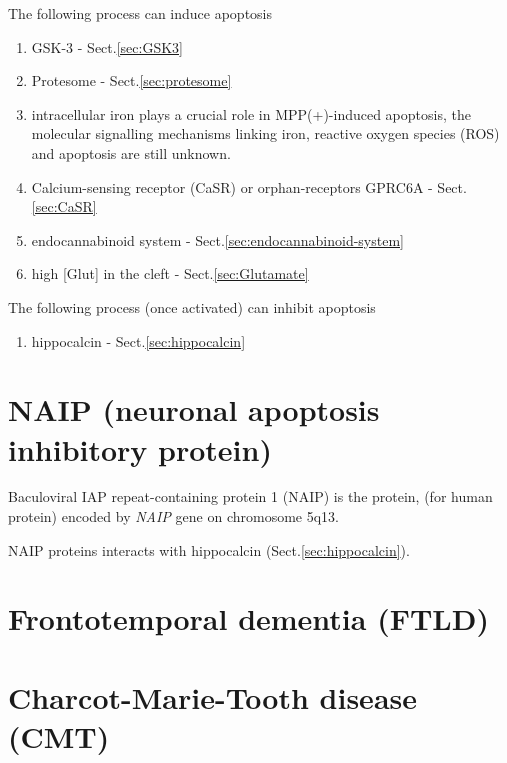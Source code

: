 The following process can induce apoptosis
\begin{enumerate}
  \item  GSK-3 - Sect.\ref{sec:GSK3}
    
  \item Protesome - Sect.\ref{sec:protesome}
  
  \item intracellular iron plays a crucial role in MPP(+)-induced apoptosis,
the molecular signalling mechanisms linking iron, reactive oxygen species (ROS)
and apoptosis are still unknown.
  
  \item Calcium-sensing receptor (CaSR) or orphan-receptors GPRC6A -
  Sect.\ref{sec:CaSR}
  
  \item endocannabinoid system - Sect.\ref{sec:endocannabinoid-system}
  
  \item high [Glut] in the cleft - Sect.\ref{sec:Glutamate}
\end{enumerate}

The following process (once activated) can inhibit apoptosis
\begin{enumerate}
  \item hippocalcin  - Sect.\ref{sec:hippocalcin}
  
\end{enumerate}

\section{NAIP (neuronal apoptosis inhibitory protein)}
\label{sec:NAIP}

Baculoviral IAP repeat-containing protein 1 (NAIP) is the protein, (for human
protein) encoded by {\it NAIP} gene on chromosome 5q13.

NAIP proteins interacts with hippocalcin
(Sect.\ref{sec:hippocalcin}).

\section{Frontotemporal dementia (FTLD)}
\label{sec:FTLD}


\section{Charcot-Marie-Tooth disease (CMT)}
\label{sec:CMT}
\label{sec:Charcot-Marie-Tooth}



